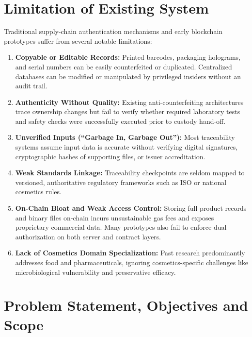 \documentclass[12pt,a4paper]{report}
\begin{document}
\chapter{Limitation of Existing System}

Traditional supply-chain authentication mechanisms and early blockchain prototypes suffer from several notable limitations:

\begin{enumerate}[leftmargin=1.5em]
    \item \textbf{Copyable or Editable Records:} Printed barcodes, packaging holograms, and serial numbers can be easily counterfeited or duplicated. Centralized databases can be modified or manipulated by privileged insiders without an audit trail.
    \item \textbf{Authenticity Without Quality:} Existing anti-counterfeiting architectures trace ownership changes but fail to verify whether required laboratory tests and safety checks were successfully executed prior to custody hand-off.
    \item \textbf{Unverified Inputs (``Garbage In, Garbage Out''):} Most traceability systems assume input data is accurate without verifying digital signatures, cryptographic hashes of supporting files, or issuer accreditation.
    \item \textbf{Weak Standards Linkage:} Traceability checkpoints are seldom mapped to versioned, authoritative regulatory frameworks such as ISO or national cosmetics rules.
    \item \textbf{On-Chain Bloat and Weak Access Control:} Storing full product records and binary files on-chain incurs unsustainable gas fees and exposes proprietary commercial data. Many prototypes also fail to enforce dual authorization on both server and contract layers.
    \item \textbf{Lack of Cosmetics Domain Specialization:} Past research predominantly addresses food and pharmaceuticals, ignoring cosmetics-specific challenges like microbiological vulnerability and preservative efficacy.
\end{enumerate}

\chapter{Problem Statement, Objectives and Scope}
\end{document}
